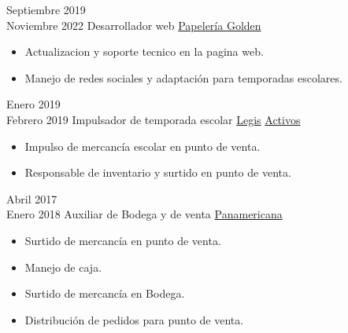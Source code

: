 \documentclass[letterpaper]{twentysecondcv} %
\begin{document}
\begin{twenty} %
	\twentyitem
    	{Septiembre 2019 \\ Noviembre 2022}
        {Desarrollador web}
        {\href{https://papeleriagolden.com/}{Papelería Golden}}
        {}
        {
        {\begin{itemize}
        \item Actualizacion y soporte tecnico en la pagina web.
        \item Manejo de redes sociales y adaptación para temporadas escolares.
    \end{itemize}}
        }
        
    \twentyitem
   	{Enero 2019 \\ Febrero 2019}
        {Impulsador de temporada escolar}
        {\href{https://www.legis.com.co}{Legis}}
        {\href{https://www.activos.com.co/}{Activos}}
        {
        {\begin{itemize}
        \item Impulso de mercancía escolar en punto de venta.
        \item Responsable de inventario y surtido en punto de venta.
    \end{itemize}}
        }
        
     \twentyitem
   		{Abril 2017 \\ Enero 2018}
        {Auxiliar de Bodega y de venta}
        {\href{https://www.panamericana.com.co/}{Panamericana}}
        {}
        {
        \begin{itemize}
        \item Surtido de mercancía en punto de venta. 
        \item Manejo de caja. 
        \item Surtido de mercancía en Bodega.
        \item Distribución de pedidos para punto de venta.
        
    \end{itemize}
    	}
        
\end{twenty}
\end{document}
